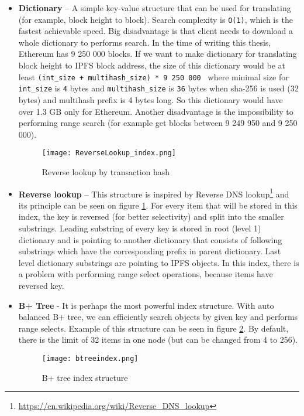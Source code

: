 \begin{itemize}
    \item \textbf{Dictionary} -- A simple key-value structure that can be used for translating (for example, block height to block). Search complexity is \texttt{O(1)}, which is the fastest achievable speed. Big disadvantage is that client needs to download a whole dictionary to performs search. In the time of writing this thesis, Ethereum has 9 250 000 blocks. If we want to make dictionary for translating block height to IPFS block address, the size of this dictionary would be at least \texttt{(int\_size + multihash\_size) * 9 250 000 } where minimal size for \texttt{int\_size} is \texttt{4} bytes and \texttt{multihash\_size} is \texttt{36} bytes when sha-256 is used (32 bytes) and multihash prefix is 4 bytes long. So this dictionary would have over 1.3 GB only for Ethereum. Another disadvantage is the impossibility to performing range search (for example get blocks between 9 249 950 and 9 250 000).

    \begin{figure}[h]
        \centering
        \texttt{[image: ReverseLookup\_index.png]}
        \caption{Reverse lookup by transaction hash}
        \label{reverseLookupIndex}
    \end{figure}


    \item \textbf{Reverse lookup} -- This structure is inspired by Reverse DNS lookup\footnote{\url{https://en.wikipedia.org/wiki/Reverse_DNS_lookup}} and its principle can be seen on figure \ref{reverseLookupIndex}. For every item that will be stored in this index, the key is reversed (for better selectivity) and split into the smaller substrings. Leading substring of every key is stored in root (level 1) dictionary and is pointing to another dictionary that consists of following substrings which have the corresponding prefix in parent dictionary. Last level dictionary substrings are pointing to IPFS objects. In this index, there is a problem with performing range select operations, because items have reversed key.
    
    \item \textbf{B+ Tree} - It is perhaps the most powerful index structure. With auto balanced B+ tree, we can efficiently search objects by given key and performs range selects. Example of this structure can be seen in figure \ref{btreeindex}. By default, there is the limit of 32 items in one node (but can be changed from 4 to 256). 
    


    \begin{figure}[h]
        \centering
        \texttt{[image: btreeindex.png]}
        \caption{B+ tree index structure}
        \label{btreeindex}
    \end{figure}

\end{itemize}

